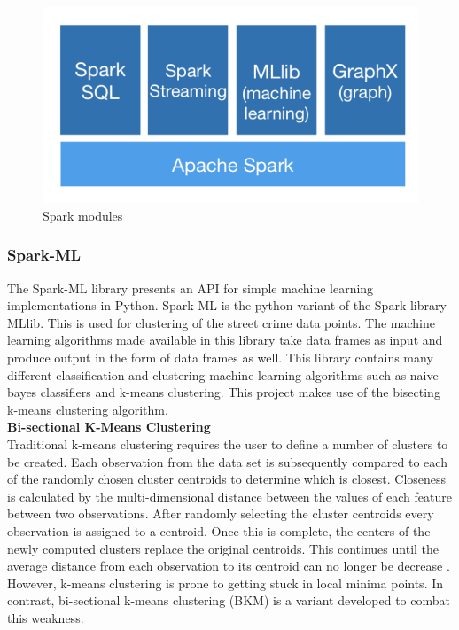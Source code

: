 \documentclass[main.tex]{subfiles}
\begin{document}
\begin{figure}[h]
    \centering
    \includegraphics{Images/Spark.png}
    \caption{Spark modules}
    \label{fig:spark}
\end{figure}

\subsubsection{Spark-ML}
The Spark-ML library \cite{pysparkML} presents an API for simple machine learning implementations in Python. Spark-ML is the python variant of the Spark library MLlib. This is used for clustering of the street crime data points. The machine learning algorithms made available in this library take data frames as input and produce output in the form of data frames as well. This library contains many different classification and clustering machine learning algorithms such as naive bayes classifiers and k-means clustering. This project makes use of the bisecting k-means clustering algorithm. \\

\textbf{Bi-sectional K-Means Clustering}\\
Traditional k-means clustering requires the user to define a number of clusters to be created. Each observation from the data set is subsequently compared to each of the randomly chosen cluster centroids to determine which is closest. Closeness is calculated by the multi-dimensional distance between the values of each feature between two observations. After randomly selecting the cluster centroids every observation is assigned to a centroid. Once this is complete, the centers of the newly computed clusters replace the original centroids. This continues until the average distance from each observation to its centroid can no longer be decrease \cite{kMeans}. However, k-means clustering is prone to getting stuck in local minima points. In contrast, bi-sectional k-means clustering (BKM) is a variant developed to combat this weakness.
\end{document}
